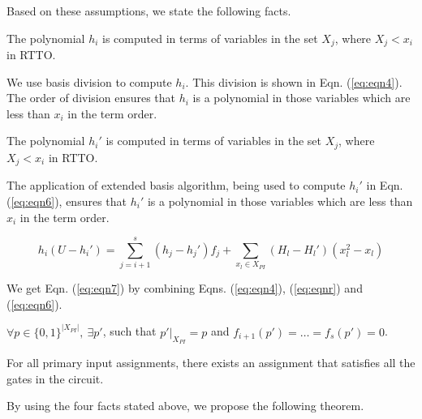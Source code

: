 Based on these assumptions, we state the following facts. 

\begin{Fact}
The polynomial $h_i$ is computed in terms of variables in the set $X_j$, where $X_j < x_i$ in RTTO. 
\end{Fact}

We use \Grobner basis division to compute $h_i$. This division is shown in Eqn. (\ref{eq:eqn4}). The order of division ensures that $h_i$ is a polynomial in those variables which are less than $x_i$ in the term order.

\begin{Fact}
The polynomial $h_i'$ is computed in terms of variables in the set $X_j$, where $X_j < x_i$ in RTTO. 
\end{Fact}

The application of extended \Grobner basis algorithm, being used to compute $h_i'$ in Eqn. (\ref{eq:eqn6}), ensures that $h_i'$ is a polynomial in those variables which are less than $x_i$ in the term order.

\begin{Fact}
\begin{equation}
    h_i(U-h_i') = \sum_{j = i+1}^{s} (h_j-h_j')f_j+\sum_{x_l\in X_{PI}}(H_l-H_l')(x_l^2-x_l)
    \label{eq:eqn7}
\end{equation}
\end{Fact}

We get Eqn. (\ref{eq:eqn7}) by combining Eqns. (\ref{eq:eqn4}), (\ref{eq:eqnr}) and (\ref{eq:eqn6}).

\begin{Fact}
$\forall p \in \{0,1\}^{|X_{PI}|},\ \exists p'$, such that $p'|_{X_{PI}} = p$ and $f_{i+1}(p') = \dots = f_s(p') = 0$.
\end{Fact}

For all primary input assignments, there exists an assignment that satisfies all the gates in the circuit. 

By using the four facts stated above, we propose the following theorem. 


